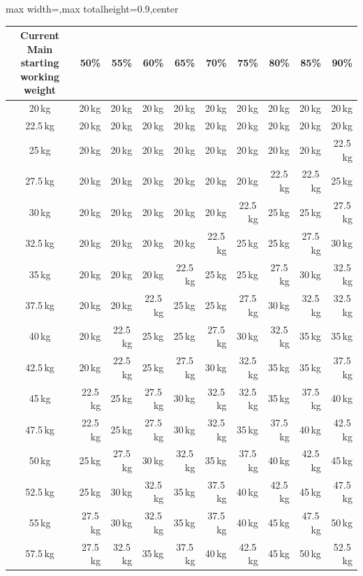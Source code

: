\documentclass[11pt,a4paper]{article}
\newcommand{\tablearraystretch}{1.15}
\begin{document}
\begin{center}
\renewcommand{\arraystretch}{\tablearraystretch}
\begin{adjustbox}{max width=\linewidth,max totalheight=0.9\textheight,center}
\begin{tabular}{crrrrrrrrr}
\toprule
Current Main starting working weight & 50\% & 55\% & 60\% & 65\% & 70\% & 75\% & 80\% & 85\% & 90\% \\
\midrule
20\,kg    & 20\,kg & 20\,kg & 20\,kg & 20\,kg & 20\,kg & 20\,kg & 20\,kg & 20\,kg & 20\,kg \\
22.5\,kg  & 20\,kg & 20\,kg & 20\,kg & 20\,kg & 20\,kg & 20\,kg & 20\,kg & 20\,kg & 20\,kg \\
25\,kg    & 20\,kg & 20\,kg & 20\,kg & 20\,kg & 20\,kg & 20\,kg & 20\,kg & 20\,kg & 22.5\,kg \\
27.5\,kg  & 20\,kg & 20\,kg & 20\,kg & 20\,kg & 20\,kg & 20\,kg & 22.5\,kg & 22.5\,kg & 25\,kg \\
30\,kg    & 20\,kg & 20\,kg & 20\,kg & 20\,kg & 20\,kg & 22.5\,kg & 25\,kg & 25\,kg & 27.5\,kg \\
32.5\,kg  & 20\,kg & 20\,kg & 20\,kg & 20\,kg & 22.5\,kg & 25\,kg & 25\,kg & 27.5\,kg & 30\,kg \\
35\,kg    & 20\,kg & 20\,kg & 20\,kg & 22.5\,kg & 25\,kg & 25\,kg & 27.5\,kg & 30\,kg & 32.5\,kg \\
37.5\,kg  & 20\,kg & 20\,kg & 22.5\,kg & 25\,kg & 25\,kg & 27.5\,kg & 30\,kg & 32.5\,kg & 32.5\,kg \\
40\,kg    & 20\,kg & 22.5\,kg & 25\,kg & 25\,kg & 27.5\,kg & 30\,kg & 32.5\,kg & 35\,kg & 35\,kg \\
42.5\,kg  & 20\,kg & 22.5\,kg & 25\,kg & 27.5\,kg & 30\,kg & 32.5\,kg & 35\,kg & 35\,kg & 37.5\,kg \\
45\,kg    & 22.5\,kg & 25\,kg & 27.5\,kg & 30\,kg & 32.5\,kg & 32.5\,kg & 35\,kg & 37.5\,kg & 40\,kg \\
47.5\,kg  & 22.5\,kg & 25\,kg & 27.5\,kg & 30\,kg & 32.5\,kg & 35\,kg & 37.5\,kg & 40\,kg & 42.5\,kg \\
50\,kg    & 25\,kg & 27.5\,kg & 30\,kg & 32.5\,kg & 35\,kg & 37.5\,kg & 40\,kg & 42.5\,kg & 45\,kg \\
52.5\,kg  & 25\,kg & 30\,kg & 32.5\,kg & 35\,kg & 37.5\,kg & 40\,kg & 42.5\,kg & 45\,kg & 47.5\,kg \\
55\,kg    & 27.5\,kg & 30\,kg & 32.5\,kg & 35\,kg & 37.5\,kg & 40\,kg & 45\,kg & 47.5\,kg & 50\,kg \\
57.5\,kg  & 27.5\,kg & 32.5\,kg & 35\,kg & 37.5\,kg & 40\,kg & 42.5\,kg & 45\,kg & 50\,kg & 52.5\,kg \\

\end{tabular}
\end{adjustbox}
\end{center}
\end{document}
